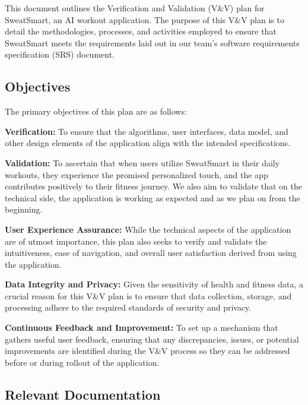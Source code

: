 \documentclass[12pt, titlepage]{article}
\begin{document}
This document outlines the Verification and Validation (V\&V) plan for SweatSmart, an AI workout application. The purpose of this V\&V plan is to detail the methodologies, processes, and activities employed to ensure that SweatSmart meets the requirements laid out in our team’s software requirements specification (SRS) document.

\subsection{Objectives}

The primary objectives of this plan are as follows: \newline

\textbf{Verification: }To ensure that the algorithms, user interfaces, data model, and other design elements of the application align with the intended specifications. \newline

\textbf{Validation: }To ascertain that when users utilize SweatSmart in their daily workouts, they experience the promised personalized touch, and the app contributes positively to their fitness journey. We also aim to validate that on the technical side, the application is working as expected and as we plan on from the beginning. \newline

\textbf{User Experience Assurance: }While the technical aspects of the application are of utmost importance, this plan also seeks to verify and validate the intuitiveness, ease of navigation, and overall user satisfaction derived from using the application. \newline

\textbf{Data Integrity and Privacy: }Given the sensitivity of health and fitness data, a crucial reason for this V\&V plan is to ensure that data collection, storage, and processing adhere to the required standards of security and privacy. \newline

\textbf{Continuous Feedback and Improvement: }To set up a mechanism that gathers useful user feedback, ensuring that any discrepancies, issues, or potential improvements are identified during the V\&V process so they can be addressed before or during rollout of the application. \newline

\subsection{Relevant Documentation}
\end{document}

